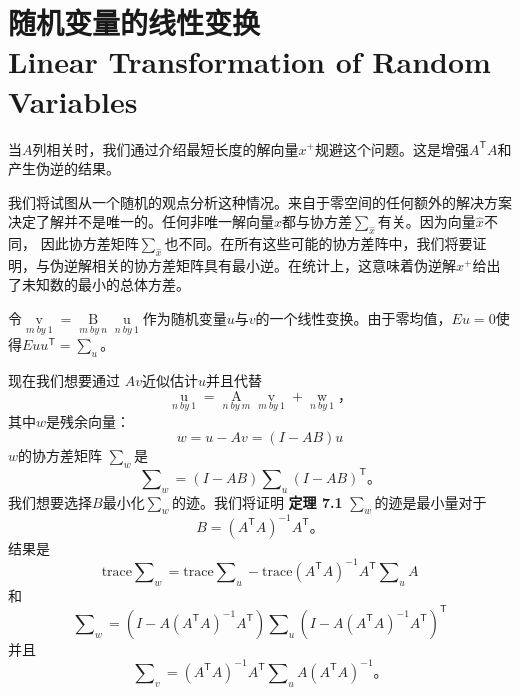 \section[随机变量的线性变换]{随机变量的线性变换\\Linear Transformation of Random Variables}	
\par \noindent
当$A$列相关时，我们通过介绍最短长度的解向量$x^+$规避这个问题。这是增强$A^\mathsf{T}A$和产生伪逆的结果。
\par
我们将试图从一个随机的观点分析这种情况。来自于零空间的任何额外的解决方案决定了解并不是唯一的。任何非唯一解向量$\hat{x}$都与协方差$\sum_{\hat{x}}$有关。因为向量$\hat{x}$不同，
因此协方差矩阵$\sum_{\hat{x}}$也不同。在所有这些可能的协方差阵中，我们将要证明，与伪逆解相关的协方差矩阵具有最小逆。在统计上，这意味着伪逆解$x^+$给出了未知数的最小的总体方差。
\par
令$\mathop{v}\limits_{m\ by\ 1} = \mathop{B}\limits_{m\ by\ n}\mathop{u}\limits_{n\ by\ 1}$作为随机变量$u$与$v$的一个线性变换。由于零均值，$E{u} = 0$使得$E{uu^\mathsf{T}} = 
\sum_u$。
\par
现在我们想要通过 $Av$近似估计$u$并且代替
\begin{equation*}
	\mathop{u}\limits_{n\ by\ 1}
	=\mathop{A}\limits_{n\ by\ m}\mathop{v}\limits_{m\ by\ 1} + \mathop{w}\limits_{n\ by\ 1}\text{，}
\end{equation*}
其中$w$是残余向量：\begin{equation}
	w
	=u - Av = (I - AB)u
\end{equation}
$w$的协方差矩阵 $\sum_w$是
\begin{equation}
	\sum\nolimits_w
	=(I - AB)\sum\nolimits_u(I - AB)^\mathsf{T}\text{。}
\end{equation}
我们想要选择$B$最小化$\sum_w$的迹。我们将证明
\textbf{定理 7.1}  $\sum_w$的迹是最小量对于
\begin{equation}
	B
	=(A^\mathsf{T}A)^{-1}A^\mathsf{T}\text{。}
\end{equation}
结果是
\begin{equation}
	\text{trace} \sum\nolimits_w
	=\text{trace} \sum\nolimits_u - \text{trace}(A^\mathsf{T}A)^{-1}A^\mathsf{T}\sum\nolimits_uA
\end{equation}
和
\begin{equation}
	\sum\nolimits_w
	=(I - A(A^\mathsf{T}A)^{-1}A^\mathsf{T})\sum\nolimits_u(I - A(A^\mathsf{T}A)^{-1}A^\mathsf{T})^\mathsf{T}
\end{equation}
并且
\begin{equation}
	\sum\nolimits_v
	=(A^\mathsf{T}A)^{-1}A^\mathsf{T}\sum\nolimits_uA(A^\mathsf{T}A)^{-1}\text{。}
\end{equation}
